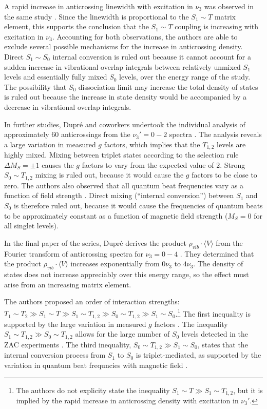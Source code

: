 \documentclass[12pt]{mitthesis}
\begin{document}
A rapid increase in anticrossing linewidth with excitation in $\nu_3$
was observed in the same study \cite{dupre91}.  Since the linewidth is
proportional to the $S_1 \sim T$ matrix element, this supports the
conclusion that the $S_1 \sim T$ coupling is increasing with
excitation in $\nu_3$.  Accounting for both observations, the authors
are able to exclude several possible mechanisms for the increase in
anticrossing density.  Direct $S_1 \sim S_0$ internal conversion is
ruled out because it cannot account for a sudden increase in
vibrational overlap integrals between relatively unmixed $S_1$ levels
and essentially fully mixed $S_0$ levels, over the energy range of the
study.  The possibility that $S_0$ dissociation limit may increase the
total density of states is ruled out because the increase in state
density would be accompanied by a decrease in vibrational overlap
integrals.

In further studies, Dupr\'{e} and coworkers undertook the individual
analysis of approximately 60 anticrossings from the $\nu_3'=0-2$
spectra \cite{dupre95a}.  The analysis reveals a large variation in
measured $g$ factors, which implies that the $T_{1,2}$ levels are
highly mixed.  Mixing between triplet states according to the
selection rule $\Delta M_S = \pm 1$ causes the $g$ factors to vary
from the expected value of $2$.  Strong $S_0 \sim T_{1,2}$ mixing is
ruled out, because it would cause the $g$ factors to be close to zero.
The authors also observed that all quantum beat frequencies vary as a
function of field strength \cite{dupre95a}.  Direct mixing (``internal
conversion'') between $S_1$ and $S_0$ is therefore ruled out, because
it would cause the frequencies of quantum beats to be approximately
constant as a function of magnetic field strength ($M_S=0$ for all
singlet levels).

In the final paper of the series, Dupr\'{e} derives the product
$\rho_{vib} \cdot \langle V \rangle$ from the Fourier transform of
anticrossing spectra for $\nu_3=0-4$ \cite{dupre95b}.  They determined
that the product $\rho_{vib} \cdot \langle V \rangle$ increases
exponentially from $0\nu_3$ to $4\nu_3$.  The density of states does
not increase appreciably over this energy range, so the effect must
arise from an increasing matrix element.

The authors proposed an order of interaction strengths: $T_1 \sim T_2
\gg S_1 \sim T \gg S_1 \sim T_{1,2} \gg S_0 \sim T_{1,2} \gg S_1 \sim
S_0$.\footnote{The authors do not explicity state the inequality $S_1
  \sim T \gg S_1 \sim T_{1,2}$, but it is implied by the rapid
  increase in anticrossing density with excitation in $\nu_3'$.}  The
first inequality is supported by the large variation in measured $g$
factors \cite{dupre95a}.  The inequality $S_1 \sim T_{1,2} \gg S_0
\sim T_{1,2}$ allows for the large number of $S_0$ levels detected in
the ZAC experiments \cite{dupre91}.  The third inequality, $S_0 \sim
T_{1,2} \gg S_1 \sim S_0$, states that the internal conversion process
from $S_1$ to $S_0$ is triplet-mediated, as supported by the variation
in quantum beat frequncies with magnetic field \cite{dupre95a}.
\end{document}
